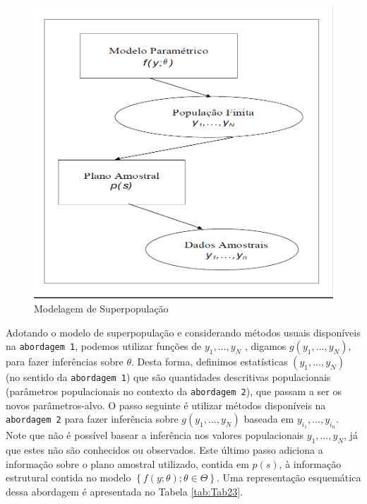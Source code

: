 \documentclass[]{book}
\theoremstyle{definition}
\theoremstyle{definition}
\theoremstyle{definition}
\theoremstyle{remark}
\begin{document}
\begin{figure}
\centering
\includegraphics{Figuras/fig23.png}
\caption{\label{fig:modsup}Modelagem de Superpopulação}
\end{figure}

Adotando o modelo de superpopulação e considerando métodos usuais
disponíveis na \texttt{abordagem\ 1}, podemos utilizar funções de
\(y_{1},\ldots ,y_{N}\) , digamos \(g( y_{1},\ldots ,y_{N})\), para
fazer inferências sobre \(\theta\). Desta forma, definimos estatísticas
\(\left( y_{1},\ldots ,y_{N}\right)\) (no sentido da
\texttt{abordagem\ 1}) que são quantidades descritivas populacionais
(parâmetros populacionais no contexto da \texttt{abordagem\ 2}), que
passam a ser os novos parâmetros-alvo. O passo seguinte é utilizar
métodos disponíveis na \texttt{abordagem\ 2} para fazer inferência sobre
\(g\left( y_{1},\ldots ,y_{N}\right)\) baseada em
\(y_{i_1},\ldots ,y_{i_n}\). Note que não é possível basear a inferência
nos valores populacionais \(y_{1},\ldots ,y_{N}\), já que estes não são
conhecidos ou observados. Este último passo adiciona a informação sobre
o plano amostral utilizado, contida em \(p(s)\), à informação estrutural
contida no modelo
\(\left\{ f\left( y;\theta \right) ;\theta \in \Theta\right\}\). Uma
representação esquemática dessa abordagem é apresentada no Tabela
\ref{tab:Tab23}.
\end{document}
